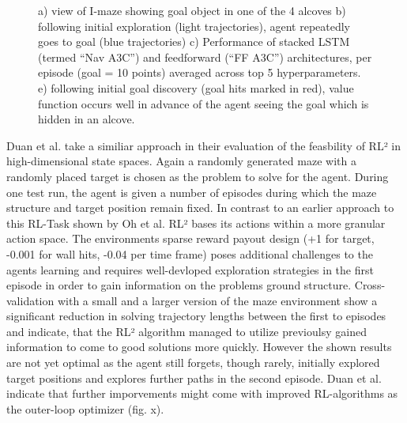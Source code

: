 \documentclass[letterpaper, 10 pt, conference]{ieeeconf}  %
\begin{document}
\begin{figure}[thpb]
        \centering
  \caption{a) view of I-maze showing goal object in one of the 4 alcoves b) following initial exploration
  (light trajectories), agent repeatedly goes to goal (blue trajectories) c) Performance of stacked LSTM (termed
  “Nav A3C”) and feedforward (“FF A3C”) architectures, per episode (goal = 10 points) averaged across top 5
  hyperparameters. e) following initial goal discovery (goal hits marked in red), value function occurs well in
  advance of the agent seeing the goal which is hidden in an alcove. \cite{wangLearningReinforcementLearn2016}
  }
        \label{figurelabel}
     \end{figure}

Duan et al.\cite{duanRLFastReinforcement2016} take a similiar approach in their 
evaluation of the feasbility of RL² in high-dimensional state spaces. Again a randomly generated 
maze with a randomly placed target is chosen as the problem to solve for the agent. During one test run, the agent is given a number 
of episodes during which the maze structure and target position remain fixed. In contrast to an earlier approach to this RL-Task shown by Oh et al.
\cite{ohZeroShotTaskGeneralization2017} 
RL² bases its actions within a more granular action space. The environments sparse reward payout design (+1 for target, 
-0.001 for wall hits, -0.04 per time frame) poses additional challenges to the agents learning and requires well-devloped exploration strategies 
in the first episode in order to gain information on the problems ground structure. Cross-validation with a small and a larger version of the 
maze environment show a significant reduction in solving trajectory lengths between the first to episodes and indicate, that the RL² algorithm 
managed to utilize previoulsy gained information to come to good solutions more quickly. However the shown results are not yet optimal
as the agent still forgets, though rarely, initially explored target positions and explores further paths in the second episode. Duan et al. 
indicate that further imporvements might come with improved RL-algorithms as the outer-loop optimizer (fig. x). 
\end{document}
